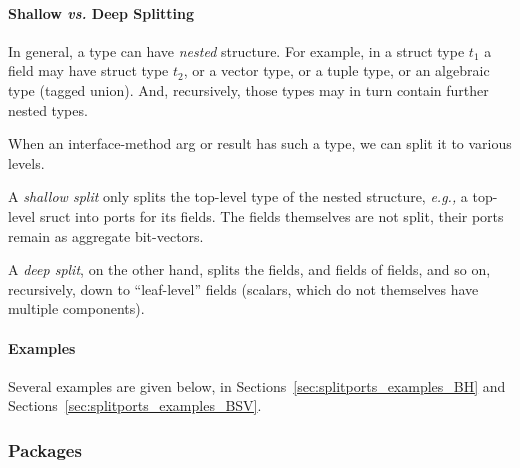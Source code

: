 
\paragraph{Shallow \emph{vs.} Deep Splitting}

\hspace*{1em}



In general, a type can have \emph{nested} structure.  For example, in
a struct type $t_1$ a field may have struct type $t_2$, or a vector
type, or a tuple type, or an algebraic type (tagged union).  And,
recursively, those types may in turn contain further nested types.

When an interface-method arg or result has such a type, we can split
it to various levels.

A \emph{shallow split} only splits the top-level type of the nested
structure, \emph{e.g.,} a top-level sruct into ports for its fields.
The fields themselves are not split, their ports remain as aggregate
bit-vectors.

A \emph{deep split}, on the other hand, splits the fields, and fields
of fields, and so on, recursively, down to ``leaf-level'' fields
(scalars, which do not themselves have multiple components).


\paragraph{Examples}

\hspace*{1em}

Several examples are given below, in
Sections~\ref{sec:splitports_examples_BH}
and
Sections~\ref{sec:splitports_examples_BSV}.


\subsubsection{Packages} 

\label{sec:Library_SplitPorts}

